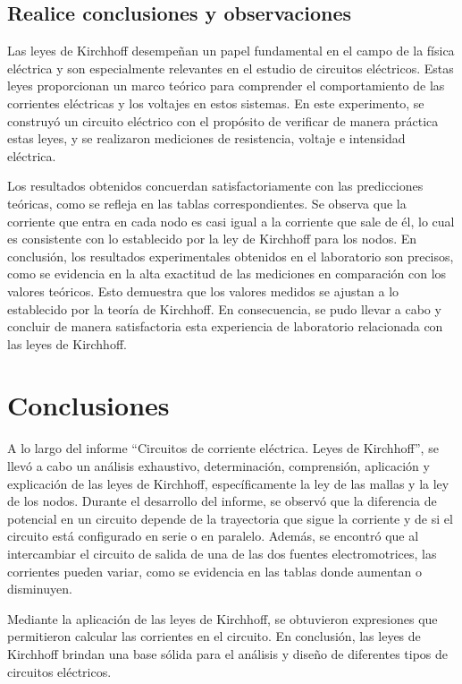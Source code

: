\documentclass[twocolumn, 12pt]{article}
\begin{document}
\subsection{Realice conclusiones y observaciones}

Las leyes de Kirchhoff desempeñan un papel fundamental en
el campo de la física eléctrica y son especialmente
relevantes en el estudio de circuitos eléctricos. Estas
leyes proporcionan un marco teórico para comprender el
comportamiento de las corrientes eléctricas y los voltajes
en estos sistemas. En este experimento, se construyó un
circuito eléctrico con el propósito de verificar de manera
práctica estas leyes, y se realizaron mediciones de
resistencia, voltaje e intensidad eléctrica.

Los resultados obtenidos concuerdan satisfactoriamente con
las predicciones teóricas, como se refleja en las tablas
correspondientes. Se observa que la corriente que entra en
cada nodo es casi igual a la corriente que sale de él, lo
cual es consistente con lo establecido por la ley de
Kirchhoff para los nodos. En conclusión, los resultados
experimentales obtenidos en el laboratorio son precisos,
como se evidencia en la alta exactitud de las mediciones en
comparación con los valores teóricos. Esto demuestra que
los valores medidos se ajustan a lo establecido por la
teoría de Kirchhoff. En consecuencia, se pudo llevar a cabo
y concluir de manera satisfactoria esta experiencia de
laboratorio relacionada con las leyes de Kirchhoff.

\section{Conclusiones}

A lo largo del informe ``Circuitos de corriente eléctrica.
Leyes de Kirchhoff'', se llevó a cabo un análisis
exhaustivo, determinación, comprensión, aplicación y
explicación de las leyes de Kirchhoff, específicamente la
ley de las mallas y la ley de los nodos. Durante el
desarrollo del informe, se observó que la diferencia de
potencial en un circuito depende de la trayectoria que
sigue la corriente y de si el circuito está configurado en
serie o en paralelo. Además, se encontró que al
intercambiar el circuito de salida de una de las dos
fuentes electromotrices, las corrientes pueden variar, como
se evidencia en las tablas donde aumentan o disminuyen.

Mediante la aplicación de las leyes de Kirchhoff, se
obtuvieron expresiones que permitieron calcular las
corrientes en el circuito. En conclusión, las leyes de
Kirchhoff brindan una base sólida para el análisis y diseño
de diferentes tipos de circuitos eléctricos.

\printbibliography
\end{document}
